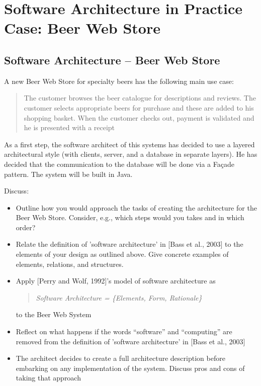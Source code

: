 \section{Software Architecture in Practice Case: Beer Web Store}

\newpage
\subsection{Software Architecture -- Beer Web Store}
A new Beer Web Store for specialty beers has the following main use
case:
\begin{quote}
  The customer browses the beer catalogue for descriptions and
  reviews. The customer selects appropriate beers for purchase and
  these are added to his shopping basket. When the customer checks
  out, payment is validated and he is presented with a receipt
\end{quote}
As a first step, the software architect of this systems has decided to
use a layered architectural style (with clients, server, and a
database in separate layers). He has decided that the communication to
the database will be done via a Fa\c cade pattern. The system will be
built in Java.

Discuss:
\begin{itemize}
    \item Outline how you would approach the tasks of creating the
    architecture for the Beer Web Store. Consider, e.g., which steps
    would you takes and in which order?
    \item Relate the definition of 'software architecture' in [Bass et
    al., 2003] to the elements of your design as outlined above. Give
    concrete examples of elements, relations, and structures.
    \item Apply [Perry and Wolf, 1992]'s model of software architecture as
      \begin{quote}
	{\it Software Architecture = \{Elements, Form, Rationale\}}
      \end{quote}
      to the Beer Web System
    \item Reflect on what happens if the words ``software'' and
    ``computing'' are removed from the definition of 'software
    architecture' in [Bass et al., 2003]
    \item The architect decides to create a full architecture
    description before embarking on any implementation of the
    system. Discuss pros and cons of taking that approach
\end{itemize}

